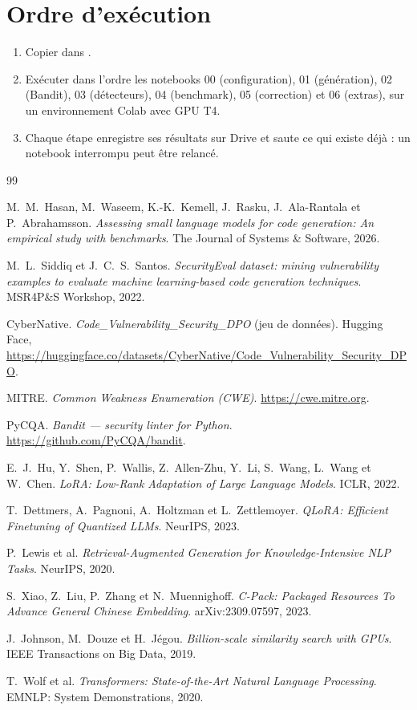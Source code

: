 \documentclass[11pt,a4paper,oneside]{report}
\newcommand{\code}[1]{\texttt{\detokenize{#1}}}
\begin{document}
\section{Ordre d'exécution}
\begin{enumerate}
  \item Copier \code{slmsec.py} dans \code{MyDrive/slm-security/}.
  \item Exécuter dans l'ordre les notebooks 00 (configuration), 01 (génération), 02 (Bandit), 03 (détecteurs), 04 (benchmark), 05 (correction) et 06 (extras), sur un environnement Colab avec GPU T4.
  \item Chaque étape enregistre ses résultats sur Drive et saute ce qui existe déjà : un notebook interrompu peut être relancé.
\end{enumerate}

\begin{thebibliography}{99}

 M.~M.~Hasan, M.~Waseem, K.-K.~Kemell, J.~Rasku, J.~Ala-Rantala et P.~Abrahamsson. \emph{Assessing small language models for code generation: An empirical study with benchmarks}. The Journal of Systems \& Software, 2026.

 M.~L.~Siddiq et J.~C.~S.~Santos. \emph{SecurityEval dataset: mining vulnerability examples to evaluate machine learning-based code generation techniques}. MSR4P\&S Workshop, 2022.

 CyberNative. \emph{Code\_Vulnerability\_Security\_DPO} (jeu de données). Hugging Face, \url{https://huggingface.co/datasets/CyberNative/Code_Vulnerability_Security_DPO}.

 MITRE. \emph{Common Weakness Enumeration (CWE)}. \url{https://cwe.mitre.org}.

 PyCQA. \emph{Bandit — security linter for Python}. \url{https://github.com/PyCQA/bandit}.

 E.~J.~Hu, Y.~Shen, P.~Wallis, Z.~Allen-Zhu, Y.~Li, S.~Wang, L.~Wang et W.~Chen. \emph{LoRA: Low-Rank Adaptation of Large Language Models}. ICLR, 2022.

 T.~Dettmers, A.~Pagnoni, A.~Holtzman et L.~Zettlemoyer. \emph{QLoRA: Efficient Finetuning of Quantized LLMs}. NeurIPS, 2023.

 P.~Lewis et al. \emph{Retrieval-Augmented Generation for Knowledge-Intensive NLP Tasks}. NeurIPS, 2020.

 S.~Xiao, Z.~Liu, P.~Zhang et N.~Muennighoff. \emph{C-Pack: Packaged Resources To Advance General Chinese Embedding}. arXiv:2309.07597, 2023.

 J.~Johnson, M.~Douze et H.~Jégou. \emph{Billion-scale similarity search with GPUs}. IEEE Transactions on Big Data, 2019.

 T.~Wolf et al. \emph{Transformers: State-of-the-Art Natural Language Processing}. EMNLP: System Demonstrations, 2020.

\end{thebibliography}
\end{document}
